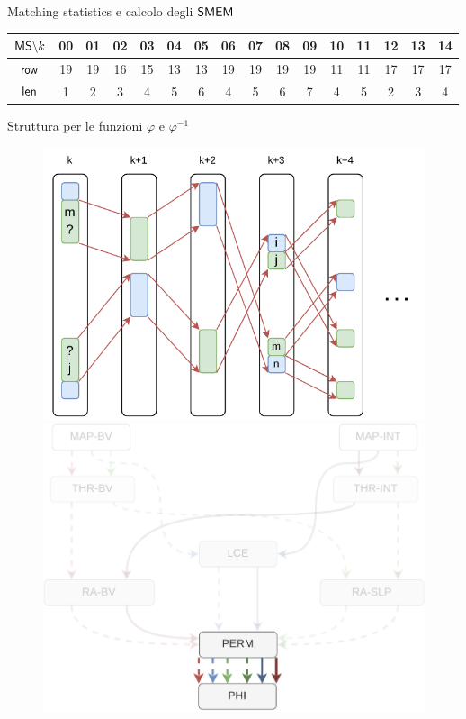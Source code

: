 \documentclass[]{beamer}
\def\len{\mbox{\rm {\sf len}}}
\def\row{\mbox{\rm {\sf row}}}
\def\MS{\mbox{\rm {\sf MS}}}
\def\SMEM{\mbox{\rm {\sf SMEM}}}
\begin{document}
\begin{frame}{Matching statistics e calcolo degli $\SMEM$}
\begin{table}[H]
\begin{tabular}{c|ccccccccccccccc}
      $\MS\backslash k$ & 00 & 01 & 02 & 03 & 04 &  {\color{nordcyan}05} & 06 & 07 & 08
      &  {\color{nordred}09} & 10 &  {\color{nordgreen}11} & 12 & 13
      &  {\color{nordpurple}14} \\
      \hline
      $\row$ & 19 & 19 & 16 & 15 & 13 &  {\color{nordcyan}13} & 19 & 19 & 19
      &  {\color{nordred}19} & 11 &  {\color{nordgreen}11} & 17 & 17
      &  {\color{nordpurple}17} \\
      $\len$ & 1 & 2 & 3 & 4 & 5 & {\color{nordcyan}6} & 4 & 5 & 6
      & {\color{nordred}7} & 4 & {\color{nordgreen}5} & 2 & 3
      & {\color{nordpurple}4}\\
    \end{tabular}
  \end{table}
\end{frame}
\begin{frame}{Struttura per le funzioni $\varphi$ e $\varphi^{-1}$}
  \begin{figure}[H]
    \centering
    \includegraphics[scale = 0.65, valign=t]{img/phi.pdf}
    \includegraphics[scale = 0.28, valign=t]{img/mini_phi4.pdf}

\end{figure}
\end{frame}
\end{document}
